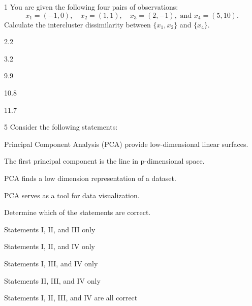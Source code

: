 %
%





\begin{question}{1}
You are given the following four pairs of observations:
\[ x_1 = (-1,0), \quad x_2 = (1,1), \quad x_3 = (2,-1), \text{ and } x_4 = (5,10). \]
Calculate the intercluster dissimilarity between $\{x_1, x_2\}$ and $\{x_4\}$.
\begin{choices}
\item 2.2
\item 3.2
\item 9.9
\item 10.8
\item 11.7
\end{choices}
\end{question}

\begin{question}{5}
Consider the following statements:
\begin{statements}
\item Principal Component Analysis (PCA) provide low-dimensional linear surfaces.
\item The first principal component is the line in p-dimensional space.
\item PCA finds a low dimension representation of a dataset.
\item PCA serves as a tool for data visualization.
\end{statements}
Determine which of the statements are correct.
\begin{choices}
\item Statements I, II, and III only
\item Statements I, II, and IV only
\item Statements I, III, and IV only
\item Statements II, III, and IV only
\item Statements I, II, III, and IV are all correct
\end{choices}
\end{question}

